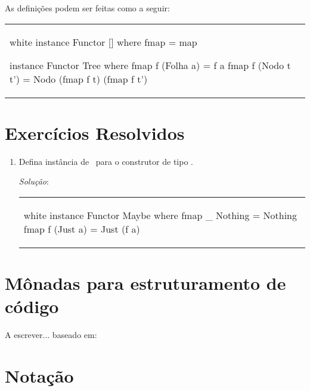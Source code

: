 As definições podem ser feitas como a seguir:

\begin{center}
\begin{tabular}{l}
\begin{alg}{.5\textwidth}{white}
instance Functor [] where
  fmap = map

instance Functor Tree where
  fmap f (Folha a) = f a
  fmap f (Nodo t t') = Nodo (fmap f t) (fmap f t')
\end{alg}
\end{tabular}
\end{center}

\section{Exercícios Resolvidos}

\begin{enumerate}

\item Defina instância de \Functor\ para o construtor de tipo
  .

{\em Solução\/}: 

\begin{center}
\begin{tabular}{l}
\begin{alg}{.5\textwidth}{white}
instance Functor Maybe where
  fmap _ Nothing  = Nothing
  fmap f (Just a) = Just (f a)
\end{alg}
\end{tabular}
\end{center}

\end{enumerate}



\section{Mônadas para estruturamento de código}
\label{Essencia-da-PF}

A escrever... baseado em: 

\section{Notação }
\label{Notacao-do}

